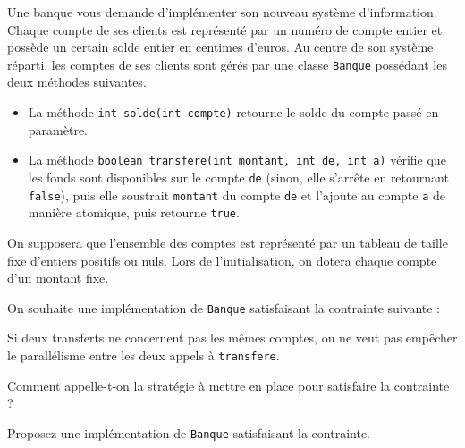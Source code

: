 
\begingroup

\begin{exercice}
  \label{exo:blocking/bank}
  
  Une banque vous demande d'implémenter son nouveau système d'information.
  Chaque compte de ses clients est représenté par un numéro de compte entier et possède un
  certain solde entier en centimes d'euros.
  Au centre de son système réparti, les comptes de ses clients sont gérés
  par une classe \lstinline{Banque} possédant les deux méthodes suivantes.

  \begin{itemize}
  \item La méthode \lstinline{int solde(int compte)} retourne le solde du compte passé en paramètre.
  \item La méthode \lstinline{boolean transfere(int montant, int de, int a)} vérifie que les fonds sont disponibles sur le compte \lstinline{de}
    (sinon, elle s'arrête en retournant \lstinline{false}), puis elle soustrait \lstinline{montant} du compte \lstinline{de} et l'ajoute
    au compte \lstinline{a} de manière atomique, puis retourne \lstinline{true}.
  \end{itemize}
  
  On supposera que l'ensemble des comptes est représenté par un tableau de taille fixe
  d'entiers positifs ou nuls. Lors de l'initialisation, on dotera chaque compte d'un montant fixe.

  On souhaite une implémentation de \lstinline{Banque} satisfaisant la contrainte suivante :
  
  \og Si deux transferts ne concernent pas les mêmes comptes, on ne veut pas empêcher le parallélisme entre les deux appels à \lstinline{transfere}.\fg

  \begin{question}
  \item Comment appelle-t-on la stratégie à mettre en place pour satisfaire la contrainte ?
  \item Proposez une implémentation de \lstinline{Banque} satisfaisant la contrainte.
  \end{question}

\end{exercice}

\endgroup
\endinput
